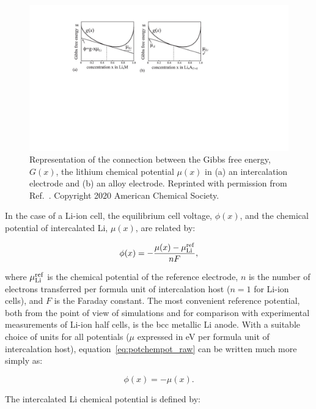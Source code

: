 \documentclass[../main.tex]{subfiles}
\begin{document}
\begin{figure}
    \centering
    \includegraphics[scale=0.8]{figures/thermodynamics_vanderven.pdf}
    \caption{Representation of the connection between the Gibbs free energy, $G(x)$, the  lithium chemical potential $\mu(x)$ in (a) an intercalation electrode and (b) an alloy electrode. Reprinted with permission from Ref.~. Copyright 2020 American Chemical Society.}
    \label{fig:vanderven_thermodynamics}
\end{figure}

In the case of a Li-ion cell, the equilibrium cell voltage, $\phi(x)$, and the chemical potential of intercalated Li, $\mu(x)$, are related by:

\begin{equation}
    \phi(x) = -\frac{\mu(x) - \mu_{\rm{Li}}^{\rm{ref}}}{nF},
    \label{eq:potchempot_raw}
\end{equation}

where $\mu_{\rm{Li}}^{\rm{ref}}$ is the chemical potential of the reference electrode, $n$ is the number of electrons transferred per formula unit of intercalation host ($n =1$ for Li-ion cells), and $F$ is the Faraday constant. The most convenient reference potential, both from the point of view of simulations and for comparison with experimental measurements of Li-ion half cells, is the bcc metallic Li anode. With a suitable choice of units for all potentials ($\mu$ expressed in eV per formula unit of intercalation host), equation~\ref{eq:potchempot_raw} can be written much more simply as:\cite{CEDER1999131}

\begin{equation}
    \phi(x) = -\mu(x).
    \label{eq:potchempot}
\end{equation}

The intercalated Li chemical potential is defined by:
\end{document}
